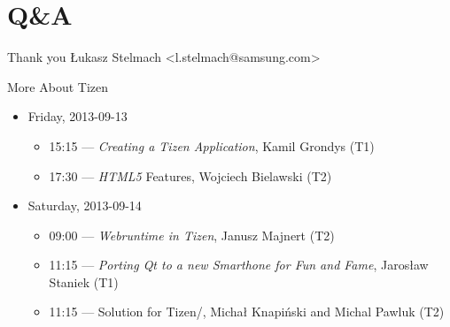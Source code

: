 \documentclass[presentation,aspectratio=43,12pt]{beamer}
\begin{document}
\section{Q\&A}
\label{sec-5}
\begin{frame}[label=sec-5-1]{Thank you}
Łukasz Stelmach <l.stelmach@samsung.com>
\end{frame}

\begin{frame}[label=sec-5-2]{More About Tizen}
\begin{itemize}
\item Friday, 2013-09-13
\begin{itemize}
\item 15:15 — \emph{Creating a Tizen Application}, Kamil Grondys (T1)
\item 17:30 — \emph{HTML5} Features, Wojciech Bielawski (T2)
\end{itemize}
\item Saturday, 2013-09-14
\begin{itemize}
\item 09:00 — \emph{Webruntime in Tizen}, Janusz Majnert (T2)
\item 11:15 — \emph{Porting Qt to a new Smarthone for Fun and Fame},
Jarosław Staniek (T1)
\item 11:15 — Solution for Tizen/, Michał Knapiński
and Michal Pawluk (T2)
\end{itemize}
\end{itemize}
\end{frame}
\end{document}
